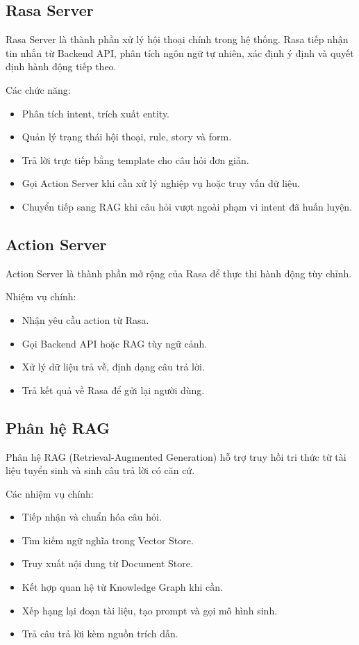 \subsection{Rasa Server}

Rasa Server là thành phần xử lý hội thoại chính trong hệ thống. Rasa tiếp nhận tin nhắn từ Backend API, phân tích ngôn ngữ tự nhiên, xác định ý định và quyết định hành động tiếp theo.

Các chức năng:
\begin{itemize}
    \item Phân tích intent, trích xuất entity.
    \item Quản lý trạng thái hội thoại, rule, story và form.
    \item Trả lời trực tiếp bằng template cho câu hỏi đơn giản.
    \item Gọi Action Server khi cần xử lý nghiệp vụ hoặc truy vấn dữ liệu.
    \item Chuyển tiếp sang RAG khi câu hỏi vượt ngoài phạm vi intent đã huấn luyện.
\end{itemize}

\subsection{Action Server}

Action Server là thành phần mở rộng của Rasa để thực thi hành động tùy chỉnh.

Nhiệm vụ chính:
\begin{itemize}
    \item Nhận yêu cầu action từ Rasa.
    \item Gọi Backend API hoặc RAG tùy ngữ cảnh.
    \item Xử lý dữ liệu trả về, định dạng câu trả lời.
    \item Trả kết quả về Rasa để gửi lại người dùng.
\end{itemize}

\subsection{Phân hệ RAG}

Phân hệ RAG (Retrieval-Augmented Generation) hỗ trợ truy hồi tri thức từ tài liệu tuyển sinh và sinh câu trả lời có căn cứ.

Các nhiệm vụ chính:
\begin{itemize}
    \item Tiếp nhận và chuẩn hóa câu hỏi.
    \item Tìm kiếm ngữ nghĩa trong Vector Store.
    \item Truy xuất nội dung từ Document Store.
    \item Kết hợp quan hệ từ Knowledge Graph khi cần.
    \item Xếp hạng lại đoạn tài liệu, tạo prompt và gọi mô hình sinh.
    \item Trả câu trả lời kèm nguồn trích dẫn.
\end{itemize}

